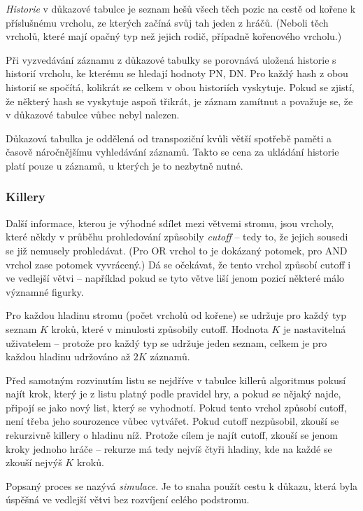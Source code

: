 \documentclass{article}
\begin{document}
\emph{Historie} v důkazové tabulce je seznam hešů všech těch pozic na cestě od 
kořene k příslušnému vrcholu, ze kterých začíná svůj tah jeden z hráčů. (Neboli
těch vrcholů, které mají opačný typ než jejich rodič, případně kořenového
vrcholu.)

Při vyzvedávání záznamu z důkazové tabulky se porovnává uložená historie s 
historií vrcholu, ke kterému se hledají hodnoty PN, DN. Pro každý hash z obou
historií se spočítá, kolikrát se celkem v obou historiích vyskytuje. Pokud se
zjistí, že některý hash se vyskytuje aspoň třikrát, je záznam zamítnut a
považuje se, že v důkazové tabulce vůbec nebyl nalezen.

Důkazová tabulka je oddělená od transpoziční kvůli větší spotřebě paměti a
časově náročnějšímu vyhledávání záznamů. Takto se cena za ukládání historie
platí pouze u záznamů, u kterých je to nezbytně nutné.

\subsubsection{Killery}
\label{sec:heur-killers}
Další informace, kterou je výhodné sdílet mezi větvemi stromu, jsou vrcholy,
které někdy v průběhu prohledování způsobily \emph{cutoff} -- tedy to, že jejich
sousedi se již nemusely prohledávat. (Pro OR vrchol to je dokázaný potomek, pro
AND vrchol zase potomek vyvrácený.) Dá se očekávat, že tento vrchol způsobí
cutoff i ve vedlejší větvi -- například pokud se tyto větve liší jenom pozicí
některé málo významné figurky.

Pro každou hladinu stromu (počet vrcholů od kořene) se udržuje pro každý typ
seznam \(K\) kroků, které v minulosti způsobily cutoff. Hodnota \(K\) je 
nastavitelná uživatelem -- protože pro každý typ se udržuje jeden seznam,
celkem je pro každou hladinu udržováno až \(2K\) záznamů.

Před samotným rozvinutím listu se nejdříve v tabulce killerů algoritmus pokusí
najít krok, který je z listu platný podle pravidel hry, a pokud se nějaký najde,
připojí se jako nový list, který se vyhodnotí. Pokud tento vrchol způsobí cutoff,
není třeba jeho sourozence vůbec vytvářet. Pokud cutoff nezpůsobil, zkouší se
rekurzivně killery o hladinu níž. Protože cílem je najít cutoff, zkouší se jenom
kroky jednoho hráče -- rekurze má tedy nejvíš čtyři hladiny, kde na každé se
zkouší nejvýš \(K\) kroků.

Popsaný proces se nazývá \emph{simulace}. Je to snaha použít cestu k důkazu,
která byla úspěšná ve vedlejší větvi bez rozvíjení celého podstromu.
\end{document}
